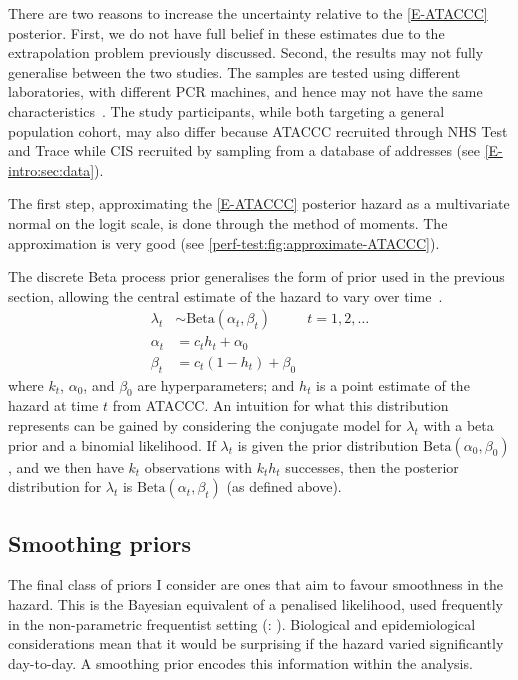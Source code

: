 \documentclass[thesis.tex]{subfiles}
\begin{document}
There are two reasons to increase the uncertainty relative to the \cref{E-ATACCC} posterior.
First, we do not have full belief in these estimates due to the extrapolation problem previously discussed.
Second, the results may not fully generalise between the two studies.
The samples are tested using different laboratories, with different PCR machines, and hence may not have the same characteristics~\autocite{punchooLaboratory}.
The study participants, while both targeting a general population cohort, may also differ because ATACCC recruited through NHS Test and Trace while CIS recruited by sampling from a database of addresses (see \cref{E-intro:sec:data}).

The first step, approximating the \cref{E-ATACCC} posterior hazard as a multivariate normal on the logit scale, is done through the method of moments.
The approximation is very good (see \cref{perf-test:fig:approximate-ATACCC}).

The discrete Beta process prior generalises the form of prior used in the previous section, allowing the central estimate of the hazard to vary over time~\autocites{ibrahimBayesian}{sunStatisticala}.
\begin{align}
  \lambda_t &\sim \text{Beta}(\alpha_t, \beta_t) &t = 1, 2, \dots \\
  \alpha_t &= c_t h_t + \alpha_0 \\
  \beta_t &= c_t (1 - h_t) + \beta_0
\end{align}
where $k_t$, $\alpha_0$, and $\beta_0$ are hyperparameters; and $h_t$ is a point estimate of the hazard at time $t$ from ATACCC.
An intuition for what this distribution represents can be gained by considering the conjugate model for $\lambda_t$ with a beta prior and a binomial likelihood.
If $\lambda_t$ is given the prior distribution $\text{Beta}(\alpha_0, \beta_0)$, and we then have $k_t$ observations with $k_t h_t$ successes, then the posterior distribution for $\lambda_t$ is $\text{Beta}(\alpha_t, \beta_t)$ (as defined above).


\subsection{Smoothing priors}
The final class of priors I consider are ones that aim to favour smoothness in the hazard.
This is the Bayesian equivalent of a penalised likelihood, used frequently in the non-parametric frequentist setting (\eg: \autocite{bacchettiNonparametric}).
Biological and epidemiological considerations mean that it would be surprising if the hazard varied significantly day-to-day.
A smoothing prior encodes this information within the analysis.
\end{document}
